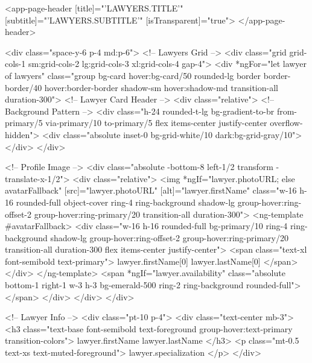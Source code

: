 <app-page-header 
  [title]="'LAWYERS.TITLE'"
  [subtitle]="'LAWYERS.SUBTITLE'"
  [isTransparent]="true">
</app-page-header>

<div class="space-y-6 p-4 md:p-6">
  <!-- Lawyers Grid -->
  <div class="grid grid-cols-1 sm:grid-cols-2 lg:grid-cols-3 xl:grid-cols-4 gap-4">
    <div *ngFor="let lawyer of lawyers" 
         class="group bg-card hover:bg-card/50 rounded-lg border border-border/40 hover:border-border 
                shadow-sm hover:shadow-md transition-all duration-300">
      <!-- Lawyer Card Header -->
      <div class="relative">
        <!-- Background Pattern -->
        <div class="h-24 rounded-t-lg bg-gradient-to-br from-primary/5 via-primary/10 to-primary/5 
                    flex items-center justify-center overflow-hidden">
          <div class="absolute inset-0 bg-grid-white/10 dark:bg-grid-gray/10"></div>
        </div>
        
        <!-- Profile Image -->
        <div class="absolute -bottom-8 left-1/2 transform -translate-x-1/2">
          <div class="relative">
            <img *ngIf="lawyer.photoURL; else avatarFallback"
                 [src]="lawyer.photoURL"
                 [alt]="lawyer.firstName"
                 class="w-16 h-16 rounded-full object-cover ring-4 ring-background shadow-lg 
                        group-hover:ring-offset-2 group-hover:ring-primary/20 transition-all duration-300">
            <ng-template #avatarFallback>
              <div class="w-16 h-16 rounded-full bg-primary/10 ring-4 ring-background shadow-lg
                          group-hover:ring-offset-2 group-hover:ring-primary/20 transition-all duration-300
                          flex items-center justify-center">
                <span class="text-xl font-semibold text-primary">
                  {{ lawyer.firstName[0] }}{{ lawyer.lastName[0] }}
                </span>
              </div>
            </ng-template>
            <span *ngIf="lawyer.availability" 
                  class="absolute bottom-1 right-1 w-3 h-3 bg-emerald-500 ring-2 ring-background rounded-full">
            </span>
          </div>
        </div>
      </div>

      <!-- Lawyer Info -->
      <div class="pt-10 p-4">
        <div class="text-center mb-3">
          <h3 class="text-base font-semibold text-foreground group-hover:text-primary transition-colors">
            {{ lawyer.firstName }} {{ lawyer.lastName }}
          </h3>
          <p class="mt-0.5 text-xs text-muted-foreground">{{ lawyer.specialization }}</p>
        </div>

